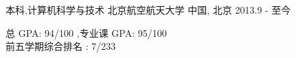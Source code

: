 


\begin{cventries}


\cventry
{本科,计算机科学与技术} %
{北京航空航天大学} %
{中国, 北京} %
{2013.9 - 至今} %
{ %
\begin{cvitems}
\item {
	总 	GPA: 94/100 ,专业课 		GPA: 95/100\\
	前五学期综合排名    : 7/233}
\end{cvitems}
}


\end{cventries}